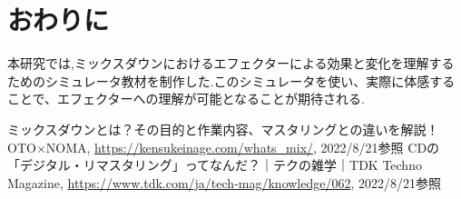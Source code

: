 \documentclass[twocolumn,10pt,a4j]{ltjsarticle}
\begin{document}
\section{おわりに}
本研究では,ミックスダウンにおけるエフェクターによる効果と変化を理解するためのシミュレータ教材を制作した.このシミュレータを使い、実際に体感することで、エフェクターへの理解が可能となることが期待される.

\begin{thebibliography}{99}
 ミックスダウンとは？その目的と作業内容、マスタリングとの違いを解説！  OTO$\times$NOMA, \url{https://kensukeinage.com/whats_mix/}, 2022/8/21参照
 CDの「デジタル・リマスタリング」ってなんだ？｜テクの雑学｜TDK Techno Magazine, \url{https://www.tdk.com/ja/tech-mag/knowledge/062}, 2022/8/21参照
\end{thebibliography}
\end{document}
